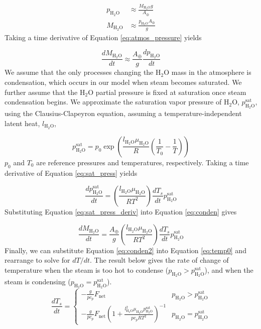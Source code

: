 \begin{align}
  p_\mathrm{H_2O} &\approx \frac{M_\mathrm{H_2O}g}{A_\oplus} \\
  M_\mathrm{H_2O} &\approx \frac{p_\mathrm{H_2O}A_\oplus}{g} \label{eq:atmos_pressure}
\end{align}
Taking a time derivative of Equation \eqref{eq:atmos_pressure} yields

\begin{equation}
  \frac{d M_\mathrm{H_2O}}{dt} \approx \frac{A_\oplus}{g} \frac{d p_\mathrm{H_2O}}{dt} \label{eq:conden}
\end{equation}
We assume that the only processes changing the H$_2$O mass in the atmosphere is condensation, which occurs in our model when steam becomes saturated. We further assume that the H$_2$O partial pressure is fixed at saturation once steam condensation begins. We approximate the saturation vapor pressure of H$_2$O, $p_\mathrm{H_2O}^\text{sat}$, using the Clausius-Clapeyron equation, assuming a temperature-independent latent heat, $l_\mathrm{H_2O}$,

\begin{equation}
  p_\mathrm{H_2O}^\text{sat} = p_0 \exp\left(\frac{l_\mathrm{H_2O} \mu_\mathrm{H_2O}}{R}\left( \frac{1}{T_0} - \frac{1}{T}  \right)\right) \label{eq:sat_press}
\end{equation}
$p_0$ and $T_0$ are reference pressures and temperatures, respectively. Taking a time derivative of Equation \eqref{eq:sat_press} yields

\begin{equation}
  \frac{dp_\mathrm{H_2O}^\text{sat}}{dt} = \left(\frac{l_\mathrm{H_2O} \mu_\mathrm{H_2O}}{RT^2}\right) \frac{dT_s}{dt} p_\mathrm{H_2O}^\text{sat} \label{eq:sat_press_deriv}
\end{equation}
Substituting Equation \eqref{eq:sat_press_deriv} into Equation \eqref{eq:conden} gives

\begin{equation}
  \frac{d M_\mathrm{H_2O}}{dt} = \frac{A_\oplus}{g} \left(\frac{l_\mathrm{H_2O} \mu_\mathrm{H_2O}}{RT^2}\right) \frac{dT_s}{dt} p_\mathrm{H_2O}^\text{sat} \label{eq:conden2}
\end{equation}
Finally, we can substitute Equation \eqref{eq:conden2} into Equation \eqref{eq:temp0} and rearrange to solve for $dT/dt$. The result below gives the rate of change of temperature when the steam is too hot to condense ($p_\mathrm{H_2O} > p_\mathrm{H_2O}^\text{sat}$), and when the steam is condensing ($p_\mathrm{H_2O} = p_\mathrm{H_2O}^\text{sat}$).
\begin{equation} \label{eq:temp1}
  \frac{d T_s}{d t} = 
  \begin{cases} 
    -\frac{g}{p c_p} F_\text{net} & p_\mathrm{H_2O} > p_\mathrm{H_2O}^\text{sat} \\
    -\frac{g}{p c_p} F_\text{net}\left( 1 + \frac{l_\mathrm{H_2O}^2 \mu_\mathrm{H_2O} p_\mathrm{H_2O}^\text{sat}}{p c_p R T^2} \right)^{-1} & p_\mathrm{H_2O} = p_\mathrm{H_2O}^\text{sat}
 \end{cases}
\end{equation} 

